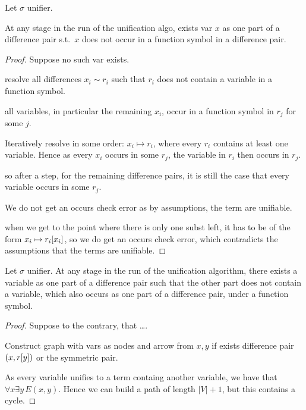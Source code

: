 \documentclass[,%
	paper=a4,%
	DIV11, %
	twoside=false,%
	liststotoc,
	bibtotoc,
	draft=false,%
	numbers=noendperiod
]{scrartcl}
\begin{document}
\begin{lemma}
	Let $\sigma$ unifier.

	At any stage in the run of the unification algo, exists var $x$ as one part of a difference pair s.t.\ $x$ does not occur in a function symbol in a difference pair.
\end{lemma}
\begin{proof}
	Suppose no such var exists. 


	{\tiny

	resolve all differences $x_i \sim r_i$ such that $r_i$ does not contain a variable in a function symbol.

	all variables, in particular the remaining $x_i$, occur in a function symbol in $r_j$ for some $j$.

	Iteratively resolve in some order: $x_i \mapsto r_i$, where every $r_i$ contains at least one variable.
	Hence as every $x_i$ occurs in some $r_j$, the variable in $r_i$ then occurs in $r_j$.
	
	so after a step, for the remaining difference pairs, it is still the case that every variable occurs in some $r_j$.

	We do not get an occurs check error as by assumptions, the term are unifiable.

	when we get to the point where there is only one subst left, it has to be of the form $x_i \mapsto r_i[x_i]$, so we do get an occurs check error, which contradicts the assumptions that the terms are unifiable.

}
\end{proof}

\begin{lemma}
	Let $\sigma$ unifier. 
	At any stage in the run of the unification algorithm, there exists a variable as one part of a difference pair such that the other part does not contain a variable, which also occurs as one part of a difference pair, under a function symbol.
\end{lemma}
\begin{proof}
	Suppose to the contrary, that \dots.

	Construct graph with vars as nodes and arrow from $x, y$ if exists difference pair $(x, r[y])$ or the symmetric pair.

	As every variable unifies to a term containg another variable, we have that $\forall x \exists y\,E(x, y)$. Hence we can build a path of length $|V|+1$, but this contains a cycle. 

\end{proof}
\end{document}

